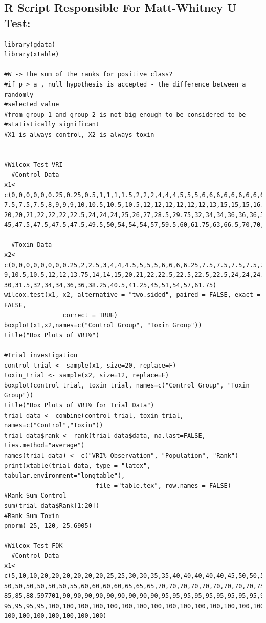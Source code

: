 \documentclass[11pt]{article}
\begin{document}
\subsection{R Script Responsible For Matt-Whitney U Test:}
\label{sec:orge0ffc8d}
\begin{verbatim}
library(gdata)
library(xtable)

#W -> the sum of the ranks for positive class?
#if p > a , null hypothesis is accepted - the difference between a randomly 
#selected value 
#from group 1 and group 2 is not big enough to be considered to be 
#statistically significant
#X1 is always control, X2 is always toxin


#Wilcox Test VRI
  #Control Data
x1<-c(0,0,0,0,0,0.25,0.25,0.5,1,1,1,1.5,2,2,2,4,4,4,5,5,5,6,6,6,6,6,6,6,6,6,6,6,6,
7.5,7.5,7.5,8,9,9,9,10,10.5,10.5,10.5,12,12,12,12,12,12,13,15,15,15,16.25,17.5,18,
20,20,21,22,22,22,22.5,24,24,24,25,26,27,28.5,29.75,32,34,34,36,36,36,38,40,40,45,
45,47.5,47.5,47.5,47.5,49.5,50,54,54,54,57,59.5,60,61.75,63,66.5,70,70,70,70,70,75)

  #Toxin Data
x2<-c(0,0,0,0,0,0,0,0.25,2,2.5,3,4,4,4.5,5,5,5,6,6,6,6.25,7.5,7.5,7.5,7.5,7.5,8,9,
9,10.5,10.5,12,12,13.75,14,14,15,20,21,22,22.5,22.5,22.5,22.5,24,24,24.5,26.25,30,
30,31.5,32,34,34,36,36,38.25,40.5,41.25,45,51,54,57,61.75)
wilcox.test(x1, x2, alternative = "two.sided", paired = FALSE, exact = FALSE, 
                correct = TRUE)
boxplot(x1,x2,names=c("Control Group", "Toxin Group"))
title("Box Plots of VRI%")

#Trial investigation
control_trial <- sample(x1, size=20, replace=F)
toxin_trial <- sample(x2, size=12, replace=F)
boxplot(control_trial, toxin_trial, names=c("Control Group", "Toxin Group"))
title("Box Plots of VRI% for Trial Data")
trial_data <- combine(control_trial, toxin_trial, names=c("Control","Toxin"))
trial_data$rank <- rank(trial_data$data, na.last=FALSE, ties.method="average")
names(trial_data) <- c("VRI% Observation", "Population", "Rank")
print(xtable(trial_data, type = "latex", tabular.environment="longtable"), 
                         file ="table.tex", row.names = FALSE)
#Rank Sum Control
sum(trial_data$Rank[1:20])
#Rank Sum Toxin
pnorm(-25, 120, 25.6905)

#Wilcox Test FDK
  #Control Data
x1<-c(5,10,10,20,20,20,20,20,20,25,25,30,30,35,35,40,40,40,40,40,45,50,50,50,50,
50,50,50,50,50,50,55,60,60,60,60,65,65,65,70,70,70,70,70,70,70,70,70,75,80,80,80,
85,85,88.597701,90,90,90,90,90,90,90,90,90,95,95,95,95,95,95,95,95,95,95,95,95,
95,95,95,95,100,100,100,100,100,100,100,100,100,100,100,100,100,100,100,100,100,
100,100,100,100,100,100,100)


\end{verbatim}
\end{document}
